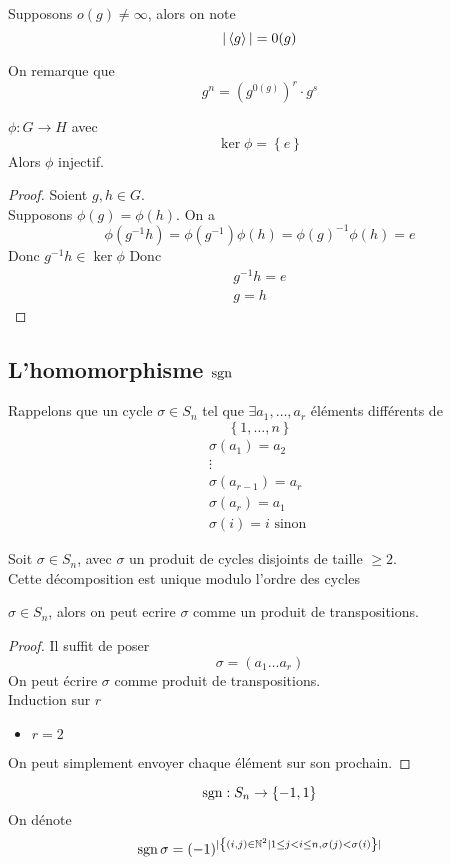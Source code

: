 \documentclass[../main.tex]{subfiles}
\begin{document}
Supposons $o( g) \neq \infty $, alors on note
\[ 
	|\left\langle g\right\rangle| = 0( g) 
\]

On remarque que
\[ 
	g^{n}= ( g^{0( g) })^{r} \cdot g^{s}
\]
\begin{propo}
$\phi: G \to H$ avec 
\[ 
\ker \phi = \left\{ e  \right\} 
\]
Alors $\phi$ injectif.
\end{propo}
\begin{proof}
Soient $g,h \in G$.\\
Supposons $\phi( g) = \phi( h) $. On a 
\[ 
	\phi( g^{-1}h) = \phi( g^{-1})  \phi( h)  = \phi( g) ^{-1} \phi( h) = e
\]
Donc $g^{-1}h \in \ker \phi$
Donc
\begin{align*}
g^{-1}h= e\\
g= h
\end{align*}
\end{proof}
\subsection{L'homomorphisme $\sgn$ }
Rappelons que un cycle $\sigma \in S_n$ tel que $\exists a_1, \ldots, a_r$ éléments différents de 
\[ 
\left\{1,\ldots,n \right\} 
\]
\begin{align*}
	\sigma( a_1) = a_2\\
	\vdots\\
	\sigma( a_{r-1} ) = a_r\\
	\sigma( a_r) = a_1\\
	\sigma( i) = i \text{ sinon } 
\end{align*}
\begin{propo}
Soit $\sigma \in S_n$, avec $\sigma$ un produit de cycles disjoints de taille $\geq 2$.\\
Cette décomposition est unique modulo l'ordre des cycles
\end{propo}
\begin{propo}
$\sigma \in S_n$, alors on peut ecrire $\sigma$ comme un produit de transpositions.
\end{propo}
\begin{proof}
Il suffit de poser 
\[ 
	\sigma = ( a_1 \ldots a_r) 
\]
On peut écrire $\sigma$ comme produit de transpositions.\\
Induction sur $r$\\
\begin{itemize}
\item $r=2$ 
\end{itemize}
On peut simplement envoyer chaque élément sur son prochain.
\end{proof}
\begin{defn}[$\sgn$ ]
\[ 
\operatorname*{sgn} : S_n \to \left\{ -1,1 \right\} 
\]
On dénote
\[ 
	\operatorname*{sgn} \sigma = ( -1) ^{ |\left\{ ( i,j)  \in \mathbb{N}^{2} | 1 \leq j < i \leq n, \sigma( j) < \sigma( i)  \right\}| } 
\]


\end{defn}
\end{document}
